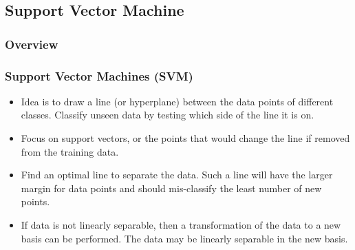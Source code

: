 \documentclass[mathserif]{beamer}
\begin{document}
	\subsection{Support Vector Machine}
	\subsubsection{Overview}
	\begin{frame}
		\frametitle{Support Vector Machines (SVM)}
		\begin{itemize}
			\item Idea is to draw a line (or hyperplane) between the data points of different classes. Classify unseen data by testing which side of the line it is on.
			\item Focus on support vectors, or the points that would change the line if removed from the training data.
			\item Find an optimal line to separate the data. Such a line will have the larger margin for data points and should mis-classify the least number of new points.
			\item If data is not linearly separable, then a transformation of the data to a new basis can be performed. The data may be linearly separable in the new basis.
		\end{itemize}
	\end{frame}
	
\end{document}

